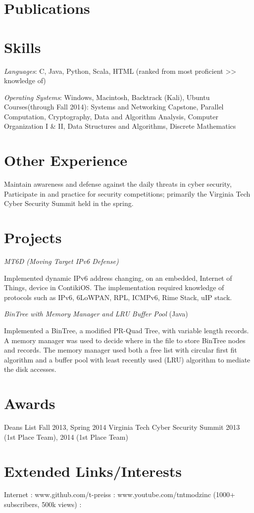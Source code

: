 \documentclass{tpreiss_cv}
\begin{document}
\section{Publications}

\section{Skills}
\textit{Languages}: C, Java, Python, Scala, HTML (ranked from most proficient >> knowledge of)

\textit{Operating Systems}: Windows, Macintosh, Backtrack (Kali), Ubuntu
Courses(through Fall 2014):    Systems and Networking Capstone, Parallel Computation, Cryptography, Data and Algorithm Analysis, Computer Organization I \& II, Data Structures and Algorithms, Discrete Mathematics

\section{Other Experience} 
Maintain awareness and defense against the daily threats in cyber security, Participate in and practice for security competitions; primarily the Virginia Tech Cyber Security Summit held in the spring.

\section{Projects}
\textit{MT6D (Moving Target IPv6 Defense)}

Implemented dynamic IPv6 address changing, on an embedded, Internet of Things, device in ContikiOS. The implementation required knowledge of protocols such as IPv6, 6LoWPAN, RPL, ICMPv6, Rime Stack, uIP stack.

\textit{BinTree with Memory Manager and LRU Buffer Pool} (Java)

Implemented a BinTree, a modified PR-Quad Tree, with variable length records. A memory manager was used to decide where in the file to store BinTree nodes and records. The memory manager used both a free list with circular first fit algorithm and a buffer pool with least recently used (LRU) algorithm to mediate the disk accesses.

\section{Awards}
Deans List Fall 2013, Spring 2014                  
Virginia Tech Cyber Security Summit 2013 (1st Place Team), 2014 (1st Place Team)

\section{Extended Links/Interests}

Internet : www.github.com/t-preiss  :  www.youtube.com/tntmodzinc  (1000+ subscribers, 500k views) :
\end{document}
